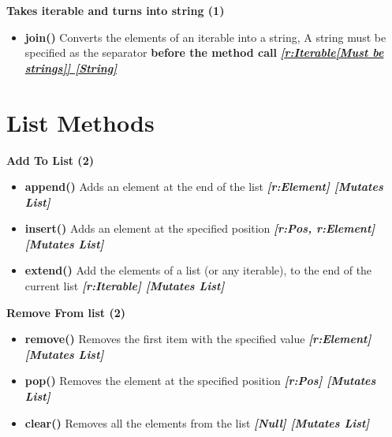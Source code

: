 \documentclass{report}
\begin{document}
    \bigbreak \noindent 
    
      \begin{center}
        \textbf{Takes iterable and turns into string (1)} 
      \end{center}
      \begin{itemize}
        \item[\ding{43}] \textbf{join()} Converts the elements of an iterable into a string, A string must be specified as the separator \textbf{before the method call}
          \smallbreak
          \textbf{\textit{\underline{[r:Iterable[Must be strings]] [String]}}}
      \end{itemize}
      \bigbreak \noindent 
    

    \pagebreak \bigbreak \noindent 
    \section{\LARGE List Methods}
    \bigbreak \noindent 
    
      \begin{center}
         \textbf{Add To List (2)} 
      \end{center}
      \begin{itemize}
        \item[\ding{43}] \textbf{append()}	Adds an element at the end of the list
          \smallbreak
          \textbf{\textit{[r:Element] [Mutates List]}}
          \smallbreak
        \item[\ding{43}] \textbf{insert()}	Adds an element at the specified position
          \smallbreak
          \textbf{\textit{[r:Pos, r:Element] [Mutates List]}}
          \smallbreak
        \item[\ding{43}] \textbf{extend()}	Add the elements of a list (or any iterable), to the end of the current list
          \smallbreak
          \textbf{\textit{[r:Iterable] [Mutates List]}}
      \end{itemize}
    

    \bigbreak \noindent 
    
      \begin{center}
        \textbf{Remove From list (2)}
      \end{center}
      \begin{itemize}
        \item[\ding{43}] \textbf{remove()}	Removes the first item with the specified value
          \smallbreak
          \textbf{\textit{[r:Element] [Mutates List]}}
          \smallbreak
        \item[\ding{43}] \textbf{pop()}		Removes the element at the specified position
          \smallbreak
          \textbf{\textit{[r:Pos] [Mutates List]}}
          \smallbreak
        \item[\ding{43}] \textbf{clear()}		Removes all the elements from the list
          \smallbreak
          \textbf{\textit{[Null] [Mutates List]}}
      \end{itemize}
    
\end{document}
